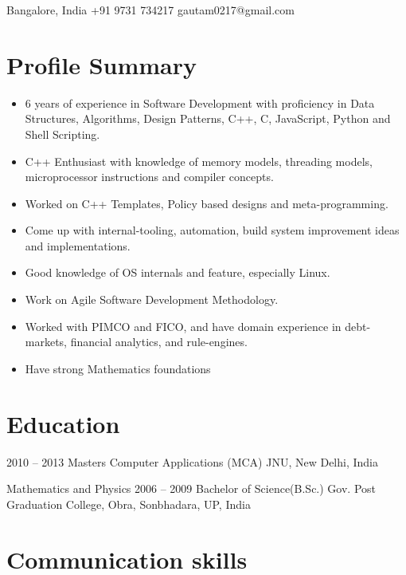 \documentclass{tccv}
\begin{document}
\personal
    {Bangalore, India}
    {+91 9731 734217}
    {gautam0217@gmail.com}
    
\section{Profile Summary}
\begin{itemize}
    \item{ 6 years of experience in Software Development with proficiency in Data Structures, Algorithms, Design Patterns, C++, C, JavaScript, Python and Shell Scripting.}
    \item{C++ Enthusiast with knowledge of memory models, threading models, microprocessor instructions and compiler concepts.}
    \item{Worked on C++ Templates, Policy based designs and meta-programming.}
    \item{Come up with internal-tooling, automation, build system improvement ideas and implementations.}
    \item{Good knowledge of OS internals and feature, especially Linux.}
    \item{Work on Agile Software Development Methodology.}
    \item{Worked with PIMCO and FICO, and have domain experience in debt-markets, financial
analytics, and rule-engines.}
    \item{Have strong Mathematics foundations}
\end{itemize}

\section{Education}

\begin{yearlist}

\item {2010 -- 2013}
     {Masters Computer Applications (MCA)}
     {JNU, New Delhi, India}

\item[Mathematics and Physics]{2006 -- 2009}
    {Bachelor of Science(B.Sc.)}
    {Gov. Post Graduation College, Obra, Sonbhadara, UP, India}

\end{yearlist}

\section{Communication skills}
\end{document}
